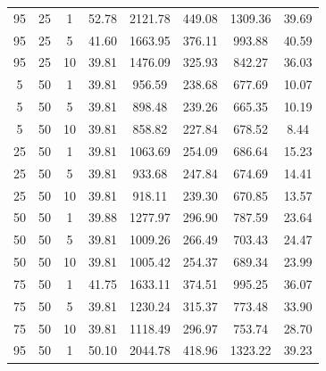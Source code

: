 \begin{table}[H]
\begin{tabular}{ccc|c|c|c|c|c}
95 & 25 & 1 & \cellcolor{gray!1}52.78 & \cellcolor{gray!1}2121.78 & \cellcolor{gray!1}449.08 & \cellcolor{gray!1}1309.36 & 39.69\\
95 & 25 & 5 & \cellcolor{gray!62}41.60 & \cellcolor{gray!1}1663.95 & \cellcolor{gray!1}376.11 & \cellcolor{gray!1}993.88 & 40.59\\
95 & 25 & 10 & \cellcolor{gray!80}39.81 & \cellcolor{gray!1}1476.09 & \cellcolor{gray!1}325.93 & \cellcolor{gray!24}842.27 & 36.03\\
5 & 50 & 1 & \cellcolor{gray!80}39.81 & \cellcolor{gray!42}956.59 & \cellcolor{gray!23}238.68 & \cellcolor{gray!75}677.69 & 10.07\\
5 & 50 & 5 & \cellcolor{gray!80}39.81 & \cellcolor{gray!52}898.48 & \cellcolor{gray!22}239.26 & \cellcolor{gray!79}665.35 & 10.19\\
5 & 50 & 10 & \cellcolor{gray!80}39.81 & \cellcolor{gray!58}858.82 & \cellcolor{gray!33}227.84 & \cellcolor{gray!75}678.52 & 8.44\\
25 & 50 & 1 & \cellcolor{gray!80}39.81 & \cellcolor{gray!24}1063.69 & \cellcolor{gray!8}254.09 & \cellcolor{gray!72}686.64 & 15.23\\
25 & 50 & 5 & \cellcolor{gray!80}39.81 & \cellcolor{gray!46}933.68 & \cellcolor{gray!14}247.84 & \cellcolor{gray!76}674.69 & 14.41\\
25 & 50 & 10 & \cellcolor{gray!80}39.81 & \cellcolor{gray!48}918.11 & \cellcolor{gray!22}239.30 & \cellcolor{gray!77}670.85 & 13.57\\
50 & 50 & 1 & \cellcolor{gray!80}39.88 & \cellcolor{gray!1}1277.97 & \cellcolor{gray!1}296.90 & \cellcolor{gray!41}787.59 & 23.64\\
50 & 50 & 5 & \cellcolor{gray!80}39.81 & \cellcolor{gray!33}1009.26 & \cellcolor{gray!1}266.49 & \cellcolor{gray!67}703.43 & 24.47\\
50 & 50 & 10 & \cellcolor{gray!80}39.81 & \cellcolor{gray!34}1005.42 & \cellcolor{gray!8}254.37 & \cellcolor{gray!71}689.34 & 23.99\\
75 & 50 & 1 & \cellcolor{gray!61}41.75 & \cellcolor{gray!1}1633.11 & \cellcolor{gray!1}374.51 & \cellcolor{gray!1}995.25 & 36.07\\
75 & 50 & 5 & \cellcolor{gray!80}39.81 & \cellcolor{gray!1}1230.24 & \cellcolor{gray!1}315.37 & \cellcolor{gray!46}773.48 & 33.90\\
75 & 50 & 10 & \cellcolor{gray!80}39.81 & \cellcolor{gray!15}1118.49 & \cellcolor{gray!1}296.97 & \cellcolor{gray!52}753.74 & 28.70\\
95 & 50 & 1 & \cellcolor{gray!1}50.10 & \cellcolor{gray!1}2044.78 & \cellcolor{gray!1}418.96 & \cellcolor{gray!1}1323.22 & 39.23\\

\end{tabular}
\end{table}
